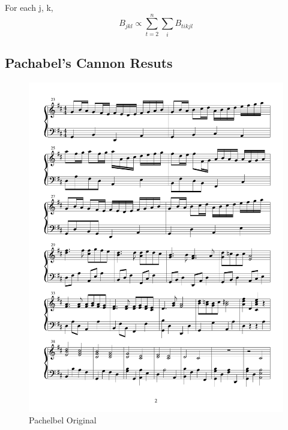 \documentclass{article} %
\begin{document}
For each j, k, \newline
$$B_{jkl} \propto \sum_{t=2}^n \sum_i B_{tikjl}$$

\subsection{Pachabel's Cannon Resuts}

\begin{figure}[H]
\centering

\includegraphics [scale = 0.6] {PachelbelOriginal-cropped.pdf}
\caption{Pachelbel Original\label{Porig}}
\end{figure}
\end{document}
